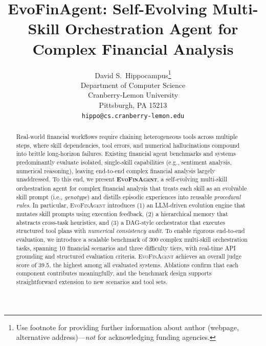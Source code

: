 \documentclass{article}
\title{EvoFinAgent: Self-Evolving Multi-Skill Orchestration Agent for Complex Financial Analysis}
\author{%
  David S.~Hippocampus\thanks{Use footnote for providing further information
    about author (webpage, alternative address)---\emph{not} for acknowledging
    funding agencies.} \\
  Department of Computer Science\\
  Cranberry-Lemon University\\
  Pittsburgh, PA 15213 \\
  \texttt{hippo@cs.cranberry-lemon.edu} \\
}
\begin{document}
\maketitle

\begin{abstract}

Real-world financial workflows require chaining heterogeneous tools across multiple steps, where skill dependencies, tool errors, and numerical hallucinations compound into brittle long-horizon failures.
Existing financial agent benchmarks and systems predominantly evaluate isolated, single-skill capabilities (e.g., sentiment analysis, numerical reasoning), leaving end-to-end complex financial analysis largely unaddressed. 
To this end, we present \textbf{\textsc{EvoFinAgent}}, a self-evolving multi-skill orchestration agent for complex financial analysis that treats each skill as an evolvable skill prompt (i.e., \emph{genotype}) and distills episodic experiences into reusable \emph{procedural rules}.
In particular, \textsc{EvoFinAgent} introduces (1) an LLM-driven evolution engine that mutates skill prompts using execution feedback, (2) a hierarchical memory that abstracts cross-task heuristics, and (3) a DAG-style orchestrator that executes structured tool plans with \emph{numerical consistency audit}.
To enable rigorous end-to-end evaluation, we introduce a scalable benchmark of 300 complex multi-skill orchestration tasks, spanning 10 financial scenarios and three difficulty tiers, with real-time API grounding and structured evaluation criteria. 
\textsc{EvoFinAgent} achieves an overall judge score of 39.5, the highest among all evaluated systems. Ablations confirm that each component contributes meaningfully, and the benchmark design supports straightforward extension to new scenarios and tool sets.


\end{abstract}
\end{document}
